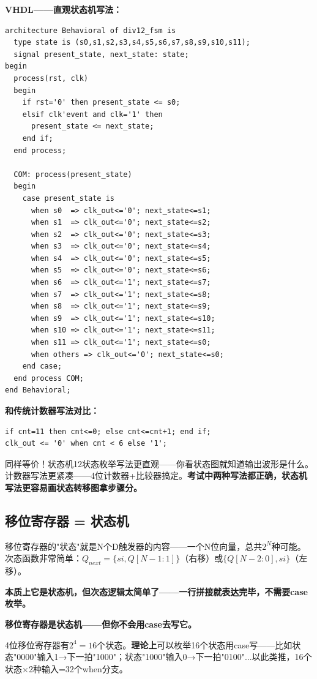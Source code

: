 \textbf{VHDL——直观状态机写法：}
\begin{lstlisting}[caption={12分频器——每个状态一行，输出和转移一起写}]
architecture Behavioral of div12_fsm is
  type state is (s0,s1,s2,s3,s4,s5,s6,s7,s8,s9,s10,s11);
  signal present_state, next_state: state;
begin
  process(rst, clk)
  begin
    if rst='0' then present_state <= s0;
    elsif clk'event and clk='1' then
      present_state <= next_state;
    end if;
  end process;

  COM: process(present_state)
  begin
    case present_state is
      when s0  => clk_out<='0'; next_state<=s1;
      when s1  => clk_out<='0'; next_state<=s2;
      when s2  => clk_out<='0'; next_state<=s3;
      when s3  => clk_out<='0'; next_state<=s4;
      when s4  => clk_out<='0'; next_state<=s5;
      when s5  => clk_out<='0'; next_state<=s6;
      when s6  => clk_out<='1'; next_state<=s7;
      when s7  => clk_out<='1'; next_state<=s8;
      when s8  => clk_out<='1'; next_state<=s9;
      when s9  => clk_out<='1'; next_state<=s10;
      when s10 => clk_out<='1'; next_state<=s11;
      when s11 => clk_out<='1'; next_state<=s0;
      when others => clk_out<='0'; next_state<=s0;
    end case;
  end process COM;
end Behavioral;
\end{lstlisting}

\textbf{和传统计数器写法对比：}
\begin{lstlisting}[caption={传统写法（模12计数器+比较）}]
if cnt=11 then cnt<=0; else cnt<=cnt+1; end if;
clk_out <= '0' when cnt < 6 else '1';
\end{lstlisting}

同样等价！状态机12状态枚举写法更直观——你看状态图就知道输出波形是什么。计数器写法更紧凑——4位计数器+比较器搞定。\textbf{考试中两种写法都正确，状态机写法更容易画状态转移图拿步骤分。}

\subsection{移位寄存器 = 状态机}

移位寄存器的"状态"就是N个D触发器的内容——一个N位向量，总共$2^N$种可能。次态函数非常简单：$Q_{next} = \{si, Q[N-1:1]\}$（右移）或$\{Q[N-2:0], si\}$（左移）。

\textbf{本质上它是状态机，但次态逻辑太简单了——一行拼接就表达完毕，不需要case枚举。}

\textbf{移位寄存器是状态机——但你不会用case去写它。}

4位移位寄存器有$2^4=16$个状态。\textbf{理论上}可以枚举16个状态用case写——比如状态"0000"输入1→下一拍"1000"；状态"1000"输入0→下一拍"0100"...以此类推，16个状态×2种输入=32个when分支。


